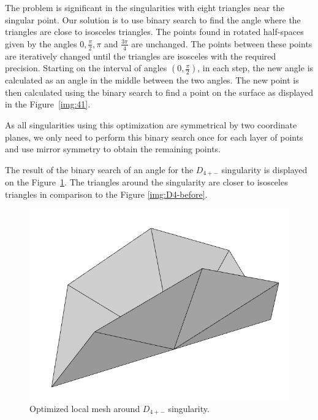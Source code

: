 The problem is significant in the singularities with eight triangles near
the singular point.
Our solution is to use binary search to find the angle where the triangles are
close to isosceles triangles. The points found in rotated half-spaces given by 
the angles $0, \frac{\pi}{2}, \pi$ and $\frac{3\pi}{4}$ are unchanged.
The points between these points are iteratively changed until the
triangles are isosceles with the required precision. Starting on the interval 
of angles $(0, \frac{\pi}{2})$, in each step, 
the new angle is calculated as an angle in the middle 
between the two angles. The new point is then calculated using the binary 
search to find a point on the surface as displayed in the Figure~\ref{img:41}.

As all singularities using this optimization are symmetrical by two coordinate
planes, we only need to perform this binary search once for each layer of 
points and use mirror symmetry to obtain the remaining points.

The result of the binary 
search of an angle for the $D_{4+-}$ singularity is displayed 
on the Figure~\ref{img:D4-after}. The triangles around the singularity
are closer to isosceles triangles in comparison to the Figure 
\ref{img:D4-before}.

\begin{figure}
    \centerline{\includegraphics[scale=0.25]{images/D4-after}}
    \caption[Optimized local mesh around $D_{4+-}$ singularity]
    {Optimized local mesh around $D_{4+-}$ singularity.}
    \label{img:D4-after}
\end{figure}

